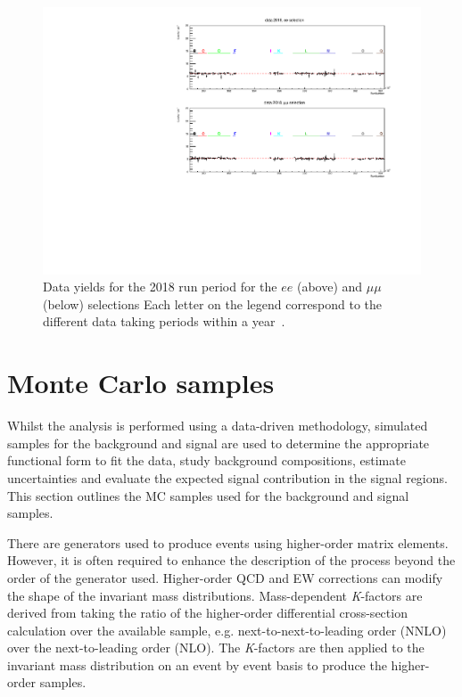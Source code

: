 \begin{figure}[ht]
\centering
\includegraphics[width=\textwidth]{figures/analysis/datamc/Yields/compare_data_yields2018.pdf}
\caption[Data yields for the 2018 run period for the $ee$ (above) and $\mu\mu$ (below) selections.]{Data yields for the 2018 run period for the $ee$ (above) and $\mu\mu$ (below) selections Each letter on the legend correspond to the different data taking periods within a year~\cite{Aad:2019fac}.}
\label{fig:yields2018}
\end{figure}

\clearpage

\section{Monte Carlo samples}\label{sec:datamc:mc}
Whilst the analysis is performed using a data-driven methodology, simulated samples for the background and signal are used to determine the appropriate functional form to fit the data, study background compositions, estimate uncertainties and evaluate the expected signal contribution in the signal regions. This section outlines the MC samples used for the background and signal samples.

There are generators used to produce events using higher-order matrix elements. However, it is often required to enhance the description of the process beyond the order of the generator used. Higher-order QCD and EW corrections can modify the shape of the invariant mass distributions. Mass-dependent \emph{K}-factors are derived from taking the ratio of the higher-order differential cross-section calculation over the available sample, e.g. next-to-next-to-leading order (NNLO) over the next-to-leading order (NLO). The \emph{K}-factors are then applied to the invariant mass distribution on an event by event basis to produce the higher-order samples. 

